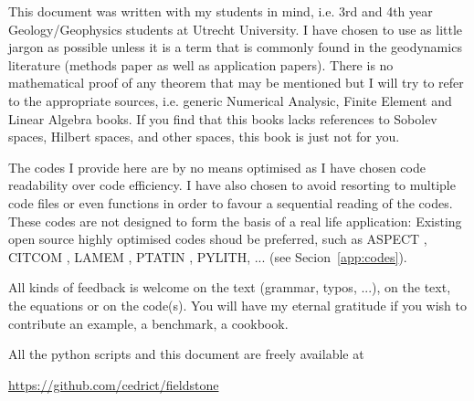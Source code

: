
This document was written with my students in mind, i.e. 3rd and 4th year 
Geology/Geophysics students at Utrecht University. 
I have chosen to use as little jargon as possible unless it is a term that is 
commonly found in the geodynamics literature (methods paper as well as 
application papers). There is no mathematical proof of any theorem that may 
be mentioned but I will try to refer to the appropriate sources, i.e.
generic Numerical Analysic, Finite Element and 
Linear Algebra books. If you find that this books lacks references
to Sobolev spaces, Hilbert spaces, and other spaces, this book is just not for you.  

The codes I provide here are by no means optimised as I have chosen code readability 
over code efficiency. I have also chosen to avoid resorting to multiple code 
files or even functions in order to favour a sequential reading of the codes. 
These codes are not designed to form the basis of a real life application:
Existing open source highly optimised codes shoud be preferred, such as 
ASPECT \cite{krhb12,hedg17}, CITCOM \cite{zhzm00,zhmt08}, LAMEM \cite{kapb16}, 
PTATIN \cite{mabl14,mabl15}, PYLITH\cite{aakw13}, ... (see Secion~\ref{app:codes}).

All kinds of feedback is welcome on the text (grammar, typos, ...), on the text, the equations
or on the code(s). You will have my eternal gratitude if you wish to contribute an 
example, a benchmark, a cookbook. 

All the python scripts and this document are freely available at 
\begin{center}
\url{https://github.com/cedrict/fieldstone}
\end{center}

